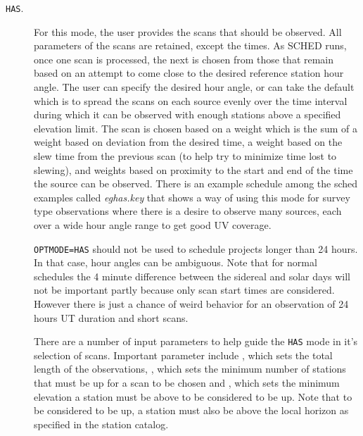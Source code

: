 \documentclass{report}
\begin{document}
\begin{description}
\item[{\tt HAS}.] For this mode, the user provides the scans that
should be observed.  All parameters of the scans are retained, except
the times.  As SCHED runs, once one scan is processed, the next is
chosen from those that remain based on an attempt to come close to the
desired reference station hour angle.  The user can specify the
desired hour angle, or can take the default which is to spread the
scans on each source evenly over the time interval during which it can
be observed with enough stations above a specified elevation limit.
The scan is chosen based on a weight which is the sum of a weight
based on deviation from the desired time, a weight based on the slew
time from the previous scan (to help try to minimize time lost to
slewing), and weights based on proximity to the start and end of the
time the source can be observed.  There is an example schedule among
the sched examples called {\sl eghas.key} that shows a way of using
this mode for survey type observations where there is a desire to
observe many sources, each over a wide hour angle range to get good UV
coverage.

{\tt OPTMODE=HAS} should not be used to schedule projects longer than
24 hours.  In that case, hour angles can be ambiguous.  Note that for
normal schedules the 4 minute difference between the sidereal and solar
days will not be important partly because only scan start times are
considered.  However there is just a chance of weird behavior for an
observation of 24 hours UT duration and short scans.

There are a number of input parameters to help guide the {\tt HAS}
mode in it's selection of scans.  Important parameter include
, which sets the total length of the
observations, , which sets the
minimum number of stations that must be up for a scan to be chosen and
, which sets the minimum elevation
a station must be above to be considered to be up.  Note that to be
considered to be up, a station must also be above the local horizon as
specified in the station catalog.


\end{description}
\end{document}
